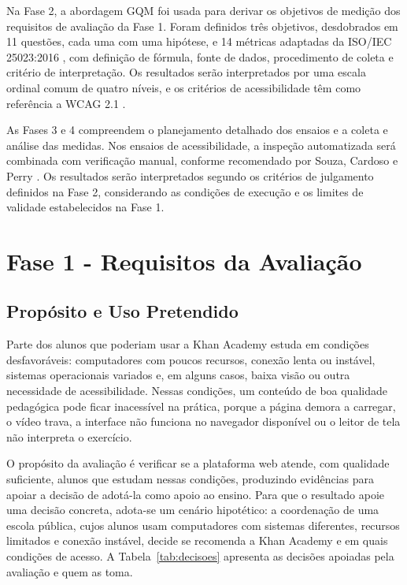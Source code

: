 \documentclass[sigconf, language=english, language=brazilian,natbib=false]{acmart}
\begin{document}
Na Fase 2, a abordagem GQM \cite{basili1994goal} foi usada para derivar os objetivos de medição dos requisitos de avaliação da Fase 1. Foram definidos três objetivos, desdobrados em 11 questões, cada uma com uma hipótese, e 14 métricas adaptadas da ISO/IEC 25023:2016 \cite{iso25023}, com definição de fórmula, fonte de dados, procedimento de coleta e critério de interpretação. Os resultados serão interpretados por uma escala ordinal comum de quatro níveis, e os critérios de acessibilidade têm como referência a WCAG 2.1 \cite{wcag21}.

As Fases 3 e 4 compreendem o planejamento detalhado dos ensaios e a coleta e análise das medidas. Nos ensaios de acessibilidade, a inspeção automatizada será combinada com verificação manual, conforme recomendado por Souza, Cardoso e Perry \cite{souza2019limitacoes}. Os resultados serão interpretados segundo os critérios de julgamento definidos na Fase 2, considerando as condições de execução e os limites de validade estabelecidos na Fase 1.

\section{Fase 1 - Requisitos da Avaliação}

\subsection{Propósito e Uso Pretendido}

Parte dos alunos que poderiam usar a Khan Academy estuda em condições desfavoráveis: computadores com poucos recursos, conexão lenta ou instável, sistemas operacionais variados e, em alguns casos, baixa visão ou outra necessidade de acessibilidade. Nessas condições, um conteúdo de boa qualidade pedagógica pode ficar inacessível na prática, porque a página demora a carregar, o vídeo trava, a interface não funciona no navegador disponível ou o leitor de tela não interpreta o exercício.

O propósito da avaliação é verificar se a plataforma web atende, com qualidade suficiente, alunos que estudam nessas condições, produzindo evidências para apoiar a decisão de adotá-la como apoio ao ensino. Para que o resultado apoie uma decisão concreta, adota-se um cenário hipotético: a coordenação de uma escola pública, cujos alunos usam computadores com sistemas diferentes, recursos limitados e conexão instável, decide se recomenda a Khan Academy e em quais condições de acesso. A Tabela~\ref{tab:decisoes} apresenta as decisões apoiadas pela avaliação e quem as toma.
\end{document}
